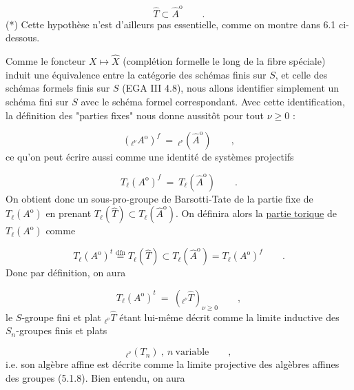 \begin{equation}\tag{5.1.3}
\hat{T} \subset \hat{A}^{\mathrm{o}} \qquad .
\end{equation}
(*) Cette hypothèse n'est d'ailleurs pas essentielle, comme on montre dans 6.1 ci-dessous.



Comme le foncteur $X \longmapsto \hat{X}$ (complétion formelle le long de la fibre spéciale) induit une équivalence entre la catégorie des schémas finis sur $S$, et celle des schémas formels finis sur $S$ (EGA III 4.8), nous allons identifier simplement un schéma fini sur $S$ avec le schéma formel correspondant. Avec cette identification, la définition des "parties fixes" nous donne aussitôt pour tout $\nu \geq 0$ :

\begin{equation}\tag{5.1.4}
({}_{\ell^\nu}A^{\mathrm{o}})^f \ = \ {}_{\ell^\nu}(\hat{A}^{\mathrm{o}}) \qquad ,
\end{equation}
ce qu'on peut écrire aussi comme une identité de systèmes projectifs

\begin{equation}\tag{5.1.5}
T_\ell(A^{\mathrm{o}})^f \ = \ T_\ell(\hat{A}^{\mathrm{o}}) \qquad .
\end{equation}
On obtient donc un sous-pro-groupe de Barsotti-Tate de la partie fixe de $T_\ell(A^{\mathrm{o}})$ en prenant $T_\ell(\hat{T}) \subset T_\ell(\hat{A}^{\mathrm{o}})$. On définira alors la \underline{partie torique} de $T_\ell(A^{\mathrm{o}})$ comme

\begin{equation}\tag{5.1.6}
T_\ell(A^{\mathrm{o}})^t \stackrel{\mathrm{dfn}}{=} T_\ell(\hat{T}) \subset T_\ell(\hat{A}^{\mathrm{o}}) = T_\ell(A^{\mathrm{o}})^f \qquad .
\end{equation}
Donc par définition, on aura

\begin{equation}\tag{5.1.7}
T_\ell(A^{\mathrm{o}})^t \ = \ ({}_{\ell^\nu}\hat{T})_{\nu \geq 0} \qquad ,
\end{equation}
le $S$-groupe fini et plat ${}_{\ell^\nu}\hat{T}$ étant lui-même décrit comme la limite inductive des $S_n$-groupes finis et plats

\begin{equation}\tag{5.1.8}
{}_{\ell^\nu}(T_n) \ , \ n \ \mbox{variable} \qquad ,
\end{equation}
i.e. son algèbre affine est décrite comme la limite projective des algèbres affines des groupes (5.1.8). Bien entendu, on aura


